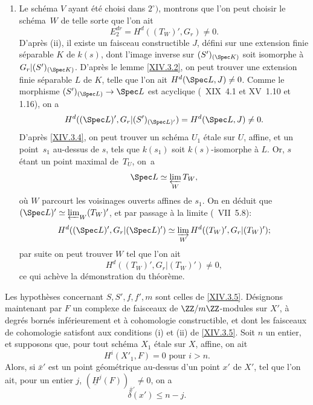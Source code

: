 \begin{enumerate}
\item[$3^\circ)$]
Le sch\'ema $V$ ayant \'et\'e choisi dans $2^\circ)$, montrons que l'on peut choisir le sch\'ema~$W$ de telle sorte que l'on ait
$$
E^{dr}_2 = H^d((T_W)', G_r) \neq 0.
$$
D'apr\`es \textup{(ii)}, il existe un faisceau constructible $J$, d\'efini sur une extension finie s\'eparable $K$ de $k(s)$, dont l'image inverse sur $(S')_{(\Spec K)}$ soit isomorphe \`a ${G_r}{|(S')_{(\Spec K)}}$. D'apr\`es le lemme \ref{XIV.3.2}, on peut trouver une extension finie s\'eparable $L$ de $K$, telle que l'on ait $H^d(\Spec L, J) \neq 0$. Comme le morphisme $(S')_{(\Spec L)} \to \Spec L$ est acyclique (~XIX~4.1 et XV~1.10 et 1.16), on a
$$
H^d((\Spec L)', {G_r}{|(S')_{(\Spec L)'}}) = H^d(\Spec L, J) \neq 0.
$$
D'apr\`es \ref{XIV.3.4}, on peut trouver un sch\'ema $U_1$ \'etale sur $U$, affine, et un point~$s_1$ au-dessus de $s$, tels que $k(s_1)$ soit $k(s)$-isomorphe \`a $L$. Or, $s$ \'etant un point maximal de~$T_U$, on~a
$$
\Spec L \simeq \varprojlim_W T_W,
$$
o\`u $W$ parcourt les voisinages ouverts affines de $s_1$. On en d\'eduit que $(\Spec L)' \simeq \varprojlim_W(T_W)'$, et par passage \`a la limite (~VII~5.8):
$$
H^d((\Spec L)', {G_r}{|(\Spec L)'}) \simeq \varinjlim_W H^d((T_W)', {G_r}{|(T_W)'});
$$
par suite on peut trouver $W$ tel que l'on ait
$$
H^d((T_W)', {G_r}{|(T_W)'})\neq 0,
$$
ce qui ach\`eve la d\'emonstration du th\'eor\`eme.
\end{enumerate}

\begin{corollaire} \label{XIV.3.6}
Les hypoth\`eses concernant $S, S', f, f', m$ sont celles de \ref{XIV.3.5}. D\'esignons maintenant par $F$ un complexe de faisceaux de $\ZZ/m\ZZ$-modules sur $X'$, \`a degr\'es born\'es inf\'erieurement et \`a cohomologie constructible, et dont les faisceaux de cohomologie satisfont aux conditions \textup{(i)} et \textup{(ii)} de \ref{XIV.3.5}. Soit $n$ un entier, et supposons que, pour tout sch\'ema $X_1$ \'etale sur $X$, affine, on ait
$$
H^i(X'_1, F)=0\text{ pour } i>n.
$$
Alors, si $\bar{x}'$ est un point g\'eom\'etrique au-dessus d'un point $x'$ de $X'$, tel que l'on ait, pour un entier $j$, $(\underline{H}^j(F))_{\bar{x}'} \neq 0$, on a
$$
\delta(x')\leq n-j.
$$
\end{corollaire}

